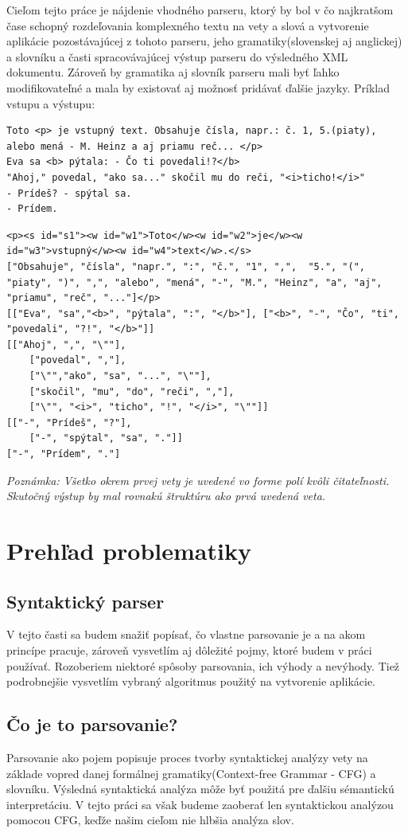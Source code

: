 \documentclass[12pt,a4paper]{report}
\theoremstyle{definition}
\theoremstyle{remark}
\begin{document}
Cieľom tejto práce je nájdenie vhodného parseru, ktorý by bol v čo najkratšom čase schopný rozdeľovania komplexného textu na vety a slová a vytvorenie aplikácie pozostávajúcej z tohoto parseru, jeho gramatiky(slovenskej aj anglickej) a slovníku a časti spracovávajúcej výstup parseru do výsledného XML dokumentu. Zároveň by gramatika aj slovník parseru mali byť ľahko modifikovateľné a mala by existovať aj možnosť pridávať ďalšie jazyky. Príklad vstupu a výstupu:
\begin{lstlisting}[caption={Vstup},style=htmlcssjs, label={lst:vstup}]
Toto <p> je vstupný text. Obsahuje čísla, napr.: č. 1, 5.(piaty), alebo mená - M. Heinz a aj priamu reč... </p>
Eva sa <b> pýtala: - Čo ti povedali!?</b>
"Ahoj," povedal, "ako sa..." skočil mu do reči, "<i>ticho!</i>"
- Prídeš? - spýtal sa.
- Prídem.
\end{lstlisting}
\begin{lstlisting}[caption={Výstup},style=htmlcssjs, label={lst:vystup}]
<p><s id="s1"><w id="w1">Toto</w><w id="w2">je</w><w id="w3">vstupný</w><w id="w4">text</w>.</s>
["Obsahuje", "čísla", "napr.", ":", "č.", "1", ",",  "5.", "(", "piaty", ")", ",", "alebo", "mená", "-", "M.", "Heinz", "a", "aj", "priamu", "reč", "..."]</p>
[["Eva", "sa","<b>", "pýtala", ":", "</b>"], ["<b>", "-", "Čo", "ti", "povedali", "?!", "</b>"]]
[["Ahoj", ",", "\""],
	["povedal", ","],
	["\"","ako", "sa", "...", "\""],
	["skočil", "mu", "do", "reči", ","],
	["\"", "<i>", "ticho", "!", "</i>", "\""]]
[["-", "Prídeš", "?"],
	["-", "spýtal", "sa", "."]]
["-", "Prídem", "."]
\end{lstlisting}
\noindent \textit{Poznámka: Všetko okrem prvej vety je uvedené vo forme polí kvôli čitateľnosti. Skutočný výstup by mal rovnakú štruktúru ako prvá uvedená veta.}

\section{Prehľad problematiky}
\subsection{Syntaktický parser}
V tejto časti sa budem snažiť popísať, čo vlastne parsovanie je a na akom princípe pracuje, zároveň vysvetlím aj dôležité pojmy, ktoré budem v práci používať. Rozoberiem niektoré spôsoby parsovania, ich výhody a nevýhody. Tiež podrobnejšie vysvetlím vybraný algoritmus použitý na vytvorenie aplikácie.

\subsection{Čo je to parsovanie?}
Parsovanie ako pojem popisuje proces tvorby syntaktickej analýzy vety na základe vopred danej formálnej gramatiky(Context-free Grammar - CFG) a slovníku. Výsledná  syntaktická analýza môže byť použitá pre ďalšiu sémantickú interpretáciu. V tejto práci sa však budeme zaoberať len syntaktickou analýzou pomocou CFG, keďže našim cieľom nie hlbšia analýza slov. \cite{Pulman}\cite{Girju}
\end{document}
